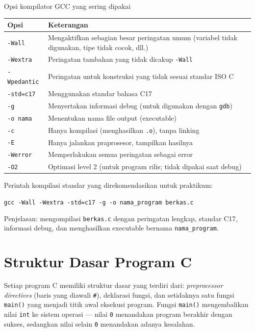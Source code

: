 \documentclass[../main.tex]{subfiles}
\begin{document}
\begin{modultable}[]{Opsi kompilator GCC yang sering dipakai}
\begin{tabular}{|l|p{9.5cm}|}
\hline
\textbf{Opsi} & \textbf{Keterangan} \\
\hline
\texttt{-Wall} & Mengaktifkan sebagian besar peringatan umum (variabel tidak digunakan, tipe tidak cocok, dll.) \\
\hline
\texttt{-Wextra} & Peringatan tambahan yang tidak dicakup \texttt{-Wall} \\
\hline
\texttt{-Wpedantic} & Peringatan untuk konstruksi yang tidak sesuai standar ISO C \\
\hline
\texttt{-std=c17} & Menggunakan standar bahasa C17 \\
\hline
\texttt{-g} & Menyertakan informasi debug (untuk digunakan dengan \texttt{gdb}) \\
\hline
\texttt{-o nama} & Menentukan nama file output (executable) \\
\hline
\texttt{-c} & Hanya kompilasi (menghasilkan \texttt{.o}), tanpa linking \\
\hline
\texttt{-E} & Hanya jalankan praprosesor, tampilkan hasilnya \\
\hline
\texttt{-Werror} & Memperlakukan semua peringatan sebagai error \\
\hline
\texttt{-O2} & Optimasi level 2 (untuk program rilis; tidak dipakai saat debug) \\
\hline
\end{tabular}
\end{modultable}

\begin{contoh}
Perintah kompilasi standar yang direkomendasikan untuk praktikum:

\texttt{gcc -Wall -Wextra -std=c17 -g -o nama\_program berkas.c}

Penjelasan: mengompilasi \texttt{berkas.c} dengan peringatan lengkap, standar C17, informasi debug, dan menghasilkan executable bernama \texttt{nama\_program}.
\end{contoh}

\section{Struktur Dasar Program C}

Setiap program C memiliki struktur dasar yang terdiri dari: \textit{preprocessor directives} (baris yang diawali \texttt{\#}), deklarasi fungsi, dan setidaknya satu fungsi \texttt{main()} yang menjadi titik awal eksekusi program. Fungsi \texttt{main()} mengembalikan nilai \texttt{int} ke sistem operasi --- nilai \texttt{0} menandakan program berakhir dengan sukses, sedangkan nilai selain \texttt{0} menandakan adanya kesalahan.
\end{document}
